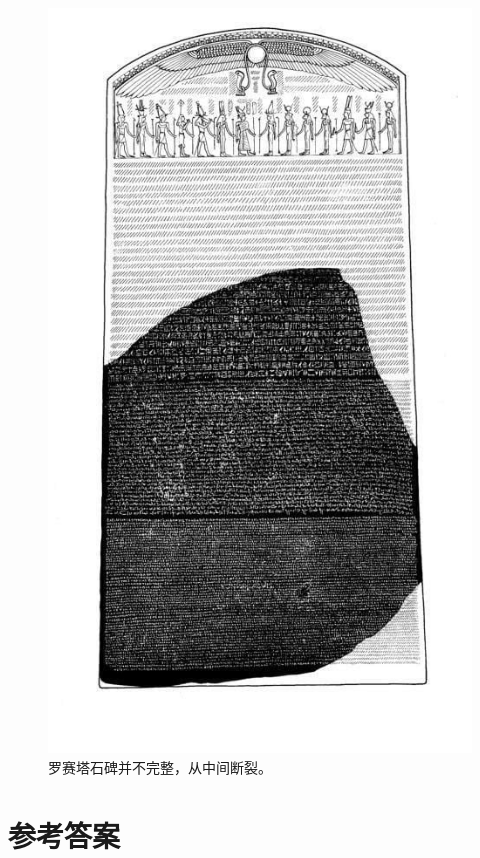 \documentclass[b5paper]{ctexart}
\begin{document}
 \begin{figure}[htbp]
  \centering
  \includegraphics[scale=0.4]{img/Rosetta-stone-recons}
  \caption{罗赛塔石碑并不完整，从中间断裂。}
  \label{fig:rosetta-stone-recons}
 \end{figure}

\ifx\wholebook\relax \else
\section{参考答案}
\shipoutAnswer

\begin{thebibliography}{99}




\end{thebibliography}

\expandafter\enddocument

\fi
\end{document}
